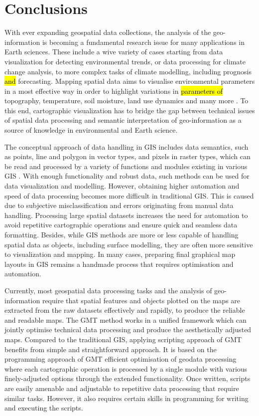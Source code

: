 \documentclass[ijgi,article,submit,pdftex,moreauthors]{Definitions/mdpi}
\begin{document}
\section{Conclusions}

With ever expanding geospatial data collections, the analysis of the geo-information is becoming a fundamental research issue for many applications in Earth sciences. These include a wive variety of cases starting from data visualization for detecting environmental trends, or data processing for climate change analysis, to more complex tasks of climate modelling, including prognosis \hl{and} forecasting. Mapping spatial data aims to visualise environmental parameters in a most effective way in order to highlight variations in \hl{parameters of} topography, temperature, soil moisture, land use dynamics and many more \cite{Moreri,Mpofu,Lemenkova202203,Ramberg2006a,LANCASTER2022318}. To this end, cartographic visualization has to bridge the gap between technical issues of spatial data processing and semantic interpretation of geo-information as a source of knowledge in environmental and Earth science. 

The conceptual approach of data handling in GIS includes data semantics, such as points, line and polygon in vector types, and pixels in raster types, which can be read and processed by a variety of functions and modules existing in various GIS \cite{ijgi11040257,Lemenkova202140,ijgi9110631}. With enough functionality and robust data, such methods can be used for data visualization and modelling. However, obtaining higher automation and speed of data processing becomes more difficult in traditional GIS. This is caused due to subjective misclassification and errors originating from manual data handling. Processing large spatial datasets increases the need for automation to avoid repetitive cartographic operations and ensure quick and seamless data formatting. Besides, while GIS methods are more or less capable of handling spatial data as objects, including surface modelling, they are often more sensitive to visualization and mapping. In many cases, preparing final graphical map layouts in GIS remains a handmade process that requires optimisation and automation.

Currently, most geospatial data processing tasks and the analysis of geo-information require that spatial features and objects plotted on the maps are extracted from the raw datasets effectively and rapidly, to produce the reliable and readable maps. The GMT method works in a unified framework which can jointly optimise technical data processing and produce the aesthetically adjusted maps. Compared to the traditional GIS, applying scripting approach of GMT benefits from simple and straightforward approach. It is based on the programming approach of GMT efficient optimisation of geodata processing where each cartographic operation is processed by a single module with various finely-adjusted options through the extended functionality. Once written, scripts are easily amenable and adjustable to repetitive data processing that require similar tasks. However, it also requires certain skills in programming for writing and executing the scripts.
\end{document}

